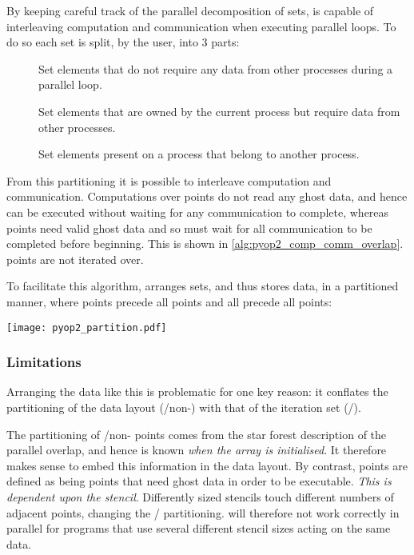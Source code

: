 \documentclass[thesis]{subfiles}
\begin{document}
By keeping careful track of the parallel decomposition of sets,  is capable of interleaving computation and communication when executing parallel loops.
To do so each set is split, by the user, into 3 parts:
\begin{description}
  \item[\coreiter{}]
    Set elements that do not require any data from other processes during a parallel loop.
  \item[\ownediter{}]
    Set elements that are owned by the current process but require data from other processes.
  \item[\ghostiter{}]
    Set elements present on a process that belong to another process.
\end{description}
From this partitioning it is possible to interleave computation and communication.
Computations over \coreiter{} points do not read any ghost data, and hence can be executed without waiting for any communication to complete, whereas \ownediter{} points need valid ghost data and so must wait for all communication to be completed before beginning.
This is shown in \cref{alg:pyop2_comp_comm_overlap}.
\ghostiter{} points are not iterated over.

To facilitate this algorithm,  arranges sets, and thus stores data, in a partitioned manner, where \coreiter{} points precede all \ownediter{} points and all \ownediter{} precede all \ghostiter{} points:
\begin{center}
  \texttt{[image: pyop2\_partition.pdf]}
\end{center}

\subsubsection{Limitations}
\label{sec:pyop2_parallel_limitation}

Arranging the data like this is problematic for one key reason: it conflates the partitioning of the data layout (\ghostiter{}/non-\ghostiter{}) with that of the iteration set (\coreiter{}/\ownediter{}).

The partitioning of \ghostiter{}/non-\ghostiter{} points comes from the star forest description of the parallel overlap, and hence is known \emph{when the array is initialised}.
It therefore makes sense to embed this information in the data layout.
By contrast, \ownediter{} points are defined as being points that need ghost data in order to be executable.
\emph{This is dependent upon the stencil}.
Differently sized stencils touch different numbers of adjacent points, changing the \coreiter{}/\ownediter{} partitioning.
 will therefore not work correctly in parallel for programs that use several different stencil sizes acting on the same data.
\end{document}
